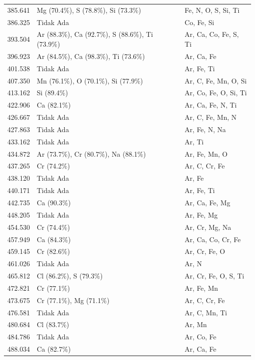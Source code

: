 \begin{onehalfspace}
\begin{longtable}{p{}p{}p{}}
        385.641 & Mg (70.4\%), S (78.8\%), Si (73.3\%) & Fe, N, O, S, Si, Ti \\
        386.325 & Tidak Ada & Co, Fe, Si \\
        393.504 & Ar (88.3\%), Ca (92.7\%), S (88.6\%), Ti (73.9\%) & Ar, Ca, Co, Fe, S, Ti \\
        396.923 & Ar (84.5\%), Ca (98.3\%), Ti (73.6\%) & Ar, Ca, Fe \\
        401.538 & Tidak Ada & Ar, Fe, Ti \\
        407.350 & Mn (76.1\%), O (70.1\%), Si (77.9\%) & Ar, C, Fe, Mn, O, Si \\
        413.162 & Si (89.4\%) & Ar, Co, Fe, O, Si, Ti \\
        422.906 & Ca (82.1\%) & Ar, Ca, Fe, N, Ti \\
        426.667 & Tidak Ada & Ar, C, Fe, Mn, N \\
        427.863 & Tidak Ada & Ar, Fe, N, Na \\
        433.162 & Tidak Ada & Ar, Ti \\
        434.872 & Ar (73.7\%), Cr (80.7\%), Na (88.1\%) & Ar, Fe, Mn, O \\
        437.265 & Cr (74.2\%) & Ar, C, Cr, Fe \\
        438.120 & Tidak Ada & Ar, Fe \\
        440.171 & Tidak Ada & Ar, Fe, Ti \\
        442.735 & Ca (90.3\%) & Ar, Ca, Fe, Mg \\
        448.205 & Tidak Ada & Ar, Fe, Mg \\
        454.530 & Cr (74.4\%) & Ar, Cr, Mg, Na \\
        457.949 & Ca (84.3\%) & Ar, Ca, Co, Cr, Fe \\
        459.145 & Cr (82.6\%) & Ar, Cr, Fe, O \\
        461.026 & Tidak Ada & Ar, N \\
        465.812 & Cl (86.2\%), S (79.3\%) & Ar, Cr, Fe, O, S, Ti \\
        472.821 & Cr (77.1\%) & Ar, Fe, Mn \\
        473.675 & Cr (77.1\%), Mg (71.1\%) & Ar, C, Cr, Fe \\
        476.581 & Tidak Ada & Ar, C, Mn, Ti \\
        480.684 & Cl (83.7\%) & Ar, Mn \\
        484.786 & Tidak Ada & Ar, Co, Fe \\
        488.034 & Ca (82.7\%) & Ar, Ca, Fe \\

\end{longtable}
\end{onehalfspace}
